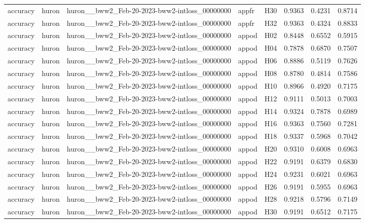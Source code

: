 \begin{table}[tbp]
\begin{tabular}{lllllrrr}
accuracy & huron & huron\_\_bww2\_Feb-20-2023-bww2-intloss\_00000000 & appfr & H30 & 0.9363 & 0.4231 & 0.8714 \\
accuracy & huron & huron\_\_bww2\_Feb-20-2023-bww2-intloss\_00000000 & appfr & H32 & 0.9363 & 0.4324 & 0.8833 \\
accuracy & huron & huron\_\_bww2\_Feb-20-2023-bww2-intloss\_00000000 & appod & H02 & 0.8448 & 0.6552 & 0.5915 \\
accuracy & huron & huron\_\_bww2\_Feb-20-2023-bww2-intloss\_00000000 & appod & H04 & 0.7878 & 0.6870 & 0.7507 \\
accuracy & huron & huron\_\_bww2\_Feb-20-2023-bww2-intloss\_00000000 & appod & H06 & 0.8886 & 0.5119 & 0.7626 \\
accuracy & huron & huron\_\_bww2\_Feb-20-2023-bww2-intloss\_00000000 & appod & H08 & 0.8780 & 0.4814 & 0.7586 \\
accuracy & huron & huron\_\_bww2\_Feb-20-2023-bww2-intloss\_00000000 & appod & H10 & 0.8966 & 0.4920 & 0.7175 \\
accuracy & huron & huron\_\_bww2\_Feb-20-2023-bww2-intloss\_00000000 & appod & H12 & 0.9111 & 0.5013 & 0.7003 \\
accuracy & huron & huron\_\_bww2\_Feb-20-2023-bww2-intloss\_00000000 & appod & H14 & 0.9324 & 0.7878 & 0.6989 \\
accuracy & huron & huron\_\_bww2\_Feb-20-2023-bww2-intloss\_00000000 & appod & H16 & 0.9363 & 0.7560 & 0.7281 \\
accuracy & huron & huron\_\_bww2\_Feb-20-2023-bww2-intloss\_00000000 & appod & H18 & 0.9337 & 0.5968 & 0.7042 \\
accuracy & huron & huron\_\_bww2\_Feb-20-2023-bww2-intloss\_00000000 & appod & H20 & 0.9310 & 0.6008 & 0.6963 \\
accuracy & huron & huron\_\_bww2\_Feb-20-2023-bww2-intloss\_00000000 & appod & H22 & 0.9191 & 0.6379 & 0.6830 \\
accuracy & huron & huron\_\_bww2\_Feb-20-2023-bww2-intloss\_00000000 & appod & H24 & 0.9231 & 0.6021 & 0.6963 \\
accuracy & huron & huron\_\_bww2\_Feb-20-2023-bww2-intloss\_00000000 & appod & H26 & 0.9191 & 0.5955 & 0.6963 \\
accuracy & huron & huron\_\_bww2\_Feb-20-2023-bww2-intloss\_00000000 & appod & H28 & 0.9218 & 0.5796 & 0.7149 \\
accuracy & huron & huron\_\_bww2\_Feb-20-2023-bww2-intloss\_00000000 & appod & H30 & 0.9191 & 0.6512 & 0.7175 \\

\end{tabular}
\end{table}
